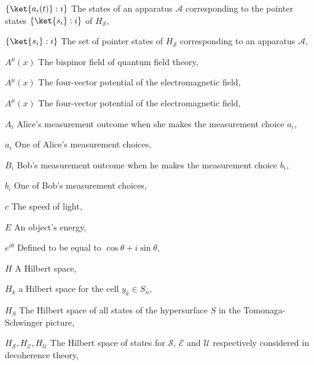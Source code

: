 \begin{thenomenclature}
  \item [{$\{\ket{a_i(t)}:i\}$}]\begingroup The states of an apparatus $\mathcal{A}$  corresponding to the pointer states $\{\ket{s_i}:i\}$ of $H_\mathcal{S}$, \nomrefpage{}
  \item [{$\{\ket{s_i}:i\}$}]\begingroup The set of pointer states of $H_\mathcal{S}$  corresponding to an apparatus $\mathcal{A}$, \nomrefpage{}
  \item [{$A^\mu (x)$}]\begingroup The bispinor field of quantum field theory, \nomrefpage {}
  \item [{$A^\mu (x)$}]\begingroup The four-vector potential of the electromagnetic field, \nomrefpage {}
  \item [{$A^\mu (x)$}]\begingroup The four-vector potential of the electromagnetic field, \nomrefpage {}
  \item [{$A_i$}]\begingroup Alice's measurement outcome when she makes the measurement choice $a_i$, \nomrefpage{}
  \item [{$a_i$}]\begingroup One of Alice's measurement choices, \nomrefpage{}
  \item [{$B_i$}]\begingroup Bob's measurement outcome when he makes the measurement choice $b_i$, \nomrefpage{}
  \item [{$b_i$}]\begingroup One of Bob's measurement choices, \nomrefpage{}
  \item [{$c$}]\begingroup The speed of light, \nomrefpage {}
  \item [{$E$}]\begingroup An object's energy, \nomrefpage{}
  \item [{$e^{i \theta }$}]\begingroup Defined to be equal to $\cos \theta + i\sin \theta $, \nomrefpage {}
  \item [{$H$}]\begingroup A Hilbert space, \nomrefpage{}
  \item [{$H_k$}]\begingroup a Hilbert space for the cell $y_k\in S_n$, \nomrefpage{}
  \item [{$H_S$}]\begingroup The Hilbert space of all states of the hypersurface $S$ in the Tomonaga-Schwinger picture, \nomrefpage{}
  \item [{$H_{\mathcal{S}}, H_{\mathcal{E}}, H_{\mathcal{U}}$}]\begingroup The Hilbert space of states for $\mathcal{S}$, $\mathcal{E}$ and $\mathcal{U}$ respectively considered in decoherence theory, \nomrefpage{}

\end{thenomenclature}
